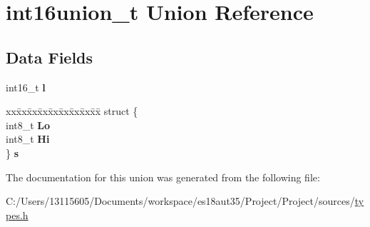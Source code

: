 \hypertarget{unionint16union__t}{}\section{int16union\+\_\+t Union Reference}
\label{unionint16union__t}
\subsection*{Data Fields}
\begin{DoxyCompactItemize}
\item 
\hypertarget{unionint16union__t_ad8a9524a204892ae3d42a2d251ea0643}{}int16\+\_\+t {\bfseries l}\label{unionint16union__t_ad8a9524a204892ae3d42a2d251ea0643}

\item 
\hypertarget{unionint16union__t_a221f29fa948c26d52413ceb54688ed96}{}\begin{tabbing}
xx\=xx\=xx\=xx\=xx\=xx\=xx\=xx\=xx\=\kill
struct \{\\
\>int8\_t {\bfseries Lo}\\
\>int8\_t {\bfseries Hi}\\
\} {\bfseries s}\label{unionint16union__t_a221f29fa948c26d52413ceb54688ed96}
\\

\end{tabbing}\end{DoxyCompactItemize}


The documentation for this union was generated from the following file\+:\begin{DoxyCompactItemize}
\item 
C\+:/\+Users/13115605/\+Documents/workspace/es18aut35/\+Project/\+Project/sources/\hyperlink{types_8h}{types.\+h}\end{DoxyCompactItemize}

